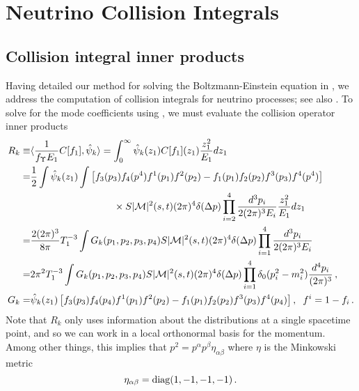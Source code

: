 \section{Neutrino Collision Integrals}\label{ch:coll:simp}
\subsection{Collision integral inner products}
Having detailed our method for solving the Boltzmann-Einstein equation in ,  we address the computation of collision integrals for neutrino processes; see also \cite{Birrell:2014uka}. To solve for the mode coefficients using , we must evaluate the collision operator inner products
\begin{align}\label{collision:integrals}
R_k\equiv&\langle\frac{1}{f_\Upsilon E_1}C[f_1],\hat\psi_k\rangle=\int_0^\infty \hat\psi_k(z_1)C[f_1](z_1) \frac{z_1^2}{E_1}dz_1\\
=&\frac{1}{2}\int \hat\psi_k(z_1)\int\left[f_3(p_3)f_4(p^4)f^1(p_1)f^2(p_2)-f_1(p_1)f_2(p_2)f^3(p_3)f^4(p^4)\right]\notag\\
&\hspace{30mm}\times S |\mathcal{M}|^2(s,t)(2\pi)^4\delta(\Delta p)\prod_{i=2}^4\frac{d^{3}p_i}{2(2\pi)^3E_i}\frac{z_1^2}{E_1}dz_1\notag\\
=&\frac{2(2\pi)^3}{8\pi}T_1^{-3}\int G_k(p_1,p_2,p_3,p_4)S |\mathcal{M}|^2(s,t)(2\pi)^4\delta(\Delta p)\prod_{i=1}^4\frac{d^{3}p_i}{2(2\pi)^3E_i}\notag\\
=&2\pi^2T_1^{-3}\int G_k(p_1,p_2,p_3,p_4)S |\mathcal{M}|^2(s,t)(2\pi)^4\delta(\Delta p)\prod_{i=1}^4 \delta_0(p_i^2-m_i^2)\frac{d^4p_i}{(2\pi)^3}\,,\notag\\
G_k=&\hat\psi_k(z_1)\left[f_3(p_3)f_4(p_4)f^1(p_1)f^2(p_2)-f_1(p_1)f_2(p_2)f^3(p_3)f^4(p_4)\right],\hspace{2mm} f^i=1- f_i\,.\notag
\end{align}
Note that $R_k$ only uses information about the distributions at a single spacetime point, and so we can work in a local orthonormal basis for the momentum.  Among other things, this implies that $p^2=p^\alpha p^\beta\eta_{\alpha\beta}$ where $\eta$ is the Minkowski metric
\begin{equation}
\eta_{\alpha\beta}=\mathrm{diag}(1,-1,-1,-1)\,.
\end{equation}

